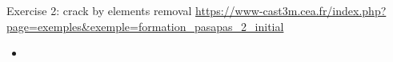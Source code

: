 


{
\begin{frame}{
                 {Exercise 2: crack by elements removal}}
             {\url{https://www-cast3m.cea.fr/index.php?page=exemples&exemple=formation_pasapas_2_initial}}
  \small
  \begin{itemize}
    \item {}\\
  \end{itemize}
\end{frame}
}
